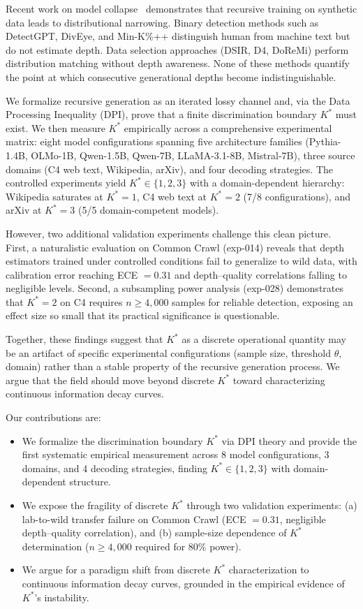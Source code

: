 \documentclass[11pt,a4paper]{article}
\begin{document}
Recent work on model collapse~\citep{shumailov2024ai,alemohammad2024selfconsuming,dohmatob2024tale} demonstrates that recursive training on synthetic data leads to distributional narrowing.
Binary detection methods such as DetectGPT, DivEye, and Min-K\%++ distinguish human from machine text but do not estimate depth.
Data selection approaches (DSIR, D4, DoReMi) perform distribution matching without depth awareness.
None of these methods quantify the point at which consecutive generational depths become indistinguishable.

We formalize recursive generation as an iterated lossy channel and, via the Data Processing Inequality (DPI), prove that a finite discrimination boundary $K^*$ must exist.
We then measure $K^*$ empirically across a comprehensive experimental matrix: eight model configurations spanning five architecture families (Pythia-1.4B, OLMo-1B, Qwen-1.5B, Qwen-7B, LLaMA-3.1-8B, Mistral-7B), three source domains (C4 web text, Wikipedia, arXiv), and four decoding strategies.
The controlled experiments yield $K^* \in \{1,2,3\}$ with a domain-dependent hierarchy: Wikipedia saturates at $K^*=1$, C4 web text at $K^*=2$ (7/8 configurations), and arXiv at $K^*=3$ (5/5 domain-competent models).

However, two additional validation experiments challenge this clean picture. First, a naturalistic evaluation on Common Crawl (exp-014) reveals that depth estimators trained under controlled conditions fail to generalize to wild data, with calibration error reaching ECE $= 0.31$ and depth--quality correlations falling to negligible levels. Second, a subsampling power analysis (exp-028) demonstrates that $K^*=2$ on C4 requires $n \geq 4{,}000$ samples for reliable detection, exposing an effect size so small that its practical significance is questionable.

Together, these findings suggest that $K^*$ as a discrete operational quantity may be an artifact of specific experimental configurations (sample size, threshold $\theta$, domain) rather than a stable property of the recursive generation process. We argue that the field should move beyond discrete $K^*$ toward characterizing continuous information decay curves.

Our contributions are:
\begin{itemize}
    \item We formalize the discrimination boundary $K^*$ via DPI theory and provide the first systematic empirical measurement across 8 model configurations, 3 domains, and 4 decoding strategies, finding $K^* \in \{1,2,3\}$ with domain-dependent structure.
    \item We expose the fragility of discrete $K^*$ through two validation experiments: (a) lab-to-wild transfer failure on Common Crawl (ECE $= 0.31$, negligible depth--quality correlation), and (b) sample-size dependence of $K^*$ determination ($n \geq 4{,}000$ required for 80\% power).
    \item We argue for a paradigm shift from discrete $K^*$ characterization to continuous information decay curves, grounded in the empirical evidence of $K^*$'s instability.
\end{itemize}
\end{document}
